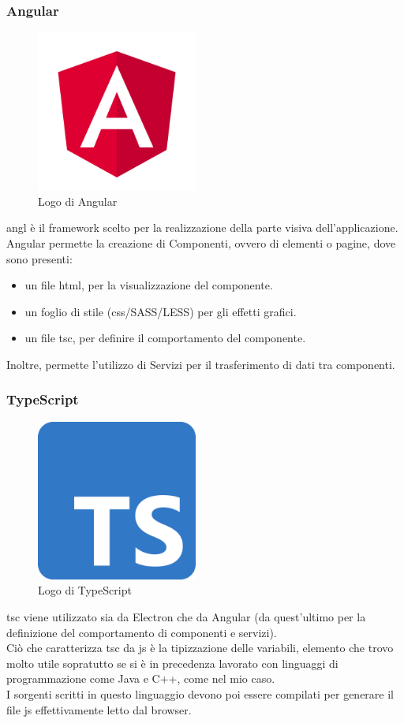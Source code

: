 \subsubsection{Angular}
\label{subsec:angular}
\begin{figure}[h]
    \centering
    \includegraphics[width=150pt]{images/technologies/angular.png}
    \caption{Logo di Angular}
    \label{fig:angular}
\end{figure}
\gls{angl} è il framework scelto per la realizzazione della parte visiva dell'applicazione.\\
Angular permette la creazione di Componenti, ovvero di elementi o pagine, dove sono presenti:
\begin{itemize}
    \item un file \gls{html}, per la visualizzazione del componente.
    \item un foglio di stile (\gls{css}/SASS/LESS) per gli effetti grafici.
    \item un file \gls{tsc}, per definire il comportamento del componente.
\end{itemize}
Inoltre, permette l'utilizzo di Servizi per il trasferimento di dati tra componenti.
\subsubsection{TypeScript}
\begin{figure}[h]
    \centering
    \includegraphics[width=150pt]{images/technologies/typescript.png}
    \caption{Logo di TypeScript}
    \label{fig:typescript}
\end{figure}
\gls{tsc} viene utilizzato sia da Electron che da Angular (da quest'ultimo per la definizione del comportamento di componenti e servizi).\\
Ciò che caratterizza \gls{tsc} da \gls{js} è la tipizzazione delle variabili, elemento che trovo molto utile sopratutto se si è in precedenza lavorato con linguaggi di programmazione come Java e C++, come nel mio caso.\\
I sorgenti scritti in questo linguaggio devono poi essere compilati per generare il file \gls{js} effettivamente letto dal browser.

